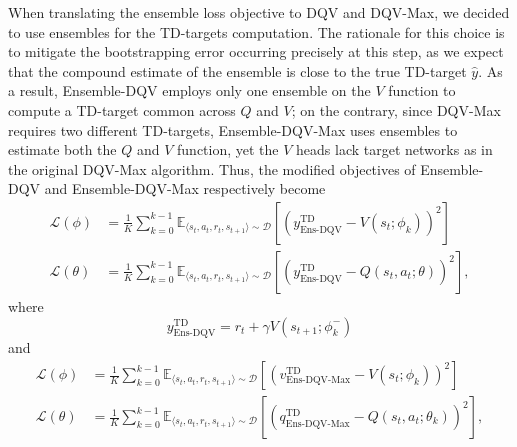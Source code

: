 When translating the ensemble loss objective to DQV and DQV-Max, we
decided to use ensembles for the TD-targets computation. The rationale
for this choice is to mitigate the bootstrapping error occurring
precisely at this step, as we expect that the compound estimate of the
ensemble is close to the true TD-target $\hat{y}$. As a result,
Ensemble-DQV employs only one ensemble on the $V$ function to compute
a TD-target common across $Q$ and $V$; on the contrary, since DQV-Max
requires two different TD-targets, Ensemble-DQV-Max uses ensembles to
estimate both the $Q$ and $V$ function, yet the $V$ heads lack target
networks as in the original DQV-Max algorithm. Thus, the modified
objectives of Ensemble-DQV and Ensemble-DQV-Max respectively become
\begin{align}
\mathcal{L}\left(\phi\right)&=\frac{1}{K}\sum_{k=0}^{k-1}\mathbb{E}_{\langle
                              s_t,a_t,r_t,s_{t+1}\rangle\sim
                              \mathcal{D}}\left[{\left(y^{\scriptscriptstyle
                              \textrm{TD}}_{\scriptscriptstyle
                              \textrm{Ens-DQV}}-V\left(s_t;\phi_{k}\right)\right)}^2\right]
  \\
\mathcal{L}\left(\theta\right)&=\frac{1}{K}\sum_{k=0}^{k-1}\mathbb{E}_{\langle
                                s_t,a_t,r_t,s_{t+1}\rangle\sim
                                \mathcal{D}}\left[{\left(y^{\scriptscriptstyle
                                \textrm{TD}}_{\scriptscriptstyle
                                \textrm{Ens-DQV}}-Q\left(s_t,a_t;\theta\right)\right)}^2\right],
\end{align}
where
\begin{equation}
  y^{\scriptscriptstyle\textrm{TD}}_{\scriptscriptstyle\textrm{Ens-DQV}}=r_t+\gamma
  V\left(s_{t+1};\phi_{k}^{-}\right)
\end{equation}
and
\begin{align}
\mathcal{L}\left(\phi\right)&=\frac{1}{K}\sum_{k=0}^{k-1}\mathbb{E}_{\langle
                              s_t,a_t,r_t,s_{t+1}\rangle\sim
                              \mathcal{D}}\left[{\left(v^{\scriptscriptstyle
                              \textrm{TD}}_{\scriptscriptstyle
                              \textrm{Ens-DQV-Max}}-V\left(s_t;\phi_k\right)\right)}^2\right]
  \\
\mathcal{L}\left(\theta\right)&=\frac{1}{K}\sum_{k=0}^{k-1}\mathbb{E}_{\langle
                                s_t,a_t,r_t,s_{t+1}\rangle\sim
                                \mathcal{D}}\left[{\left(q^{\scriptscriptstyle
                                \textrm{TD}}_{\scriptscriptstyle
                                \textrm{Ens-DQV-Max}}-Q\left(s_t,a_t;\theta_k\right)\right)}^2\right],
\end{align}

